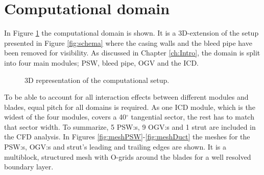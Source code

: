 \section{Computational domain}
In Figure \ref{fig:rig} the computational domain is shown. It is a 3D-extension of the setup presented in Figure \ref{fig:schema} where the casing walls and the bleed pipe have been removed for visibility. As discussed in Chapter \ref{ch:Intro}, the domain is split into four main modules; PSW, bleed pipe, OGV and the ICD.
\begin{figure}[H]
  \centering
  \caption{3D representation of the computational setup.}\label{fig:rig}
\end{figure}

To be able to account for all interaction effects between different modules and blades, equal pitch for all domains is required. As one ICD module, which is the widest of the four modules, covers a 40$^{\circ}$ tangential sector, the rest has to match that sector width. To summarize, 5 PSW:s, 9 OGV:s and 1 strut are included in the CFD analysis. In Figures \ref{fig:meshPSW}-\ref{fig:meshDuct} the meshes for the PSW:s, OGV:s and strut's leading and trailing edges are shown. It is a multiblock, structured mesh with O-grids around the blades for a well resolved boundary layer.

